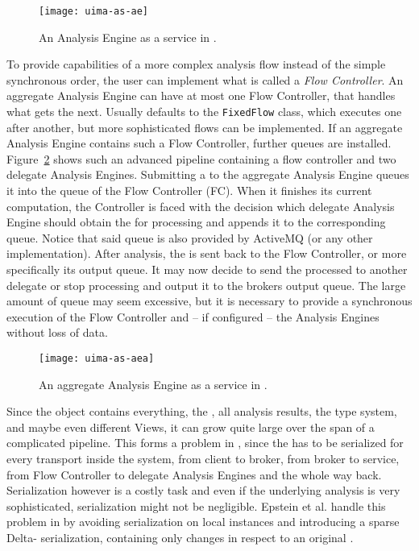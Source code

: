 \begin{figure}[hbt]
	\centering
	\texttt{[image: uima-as-ae]}
	\caption[An Analysis Engine as a service in UIMA-AS.]{An Analysis Engine as a service in \uimaas{} \cite{uimaas:documentation}.}
	\label{fig:uimaas-ae}
\end{figure}

To provide capabilities of a more complex analysis flow instead of the simple synchronous order, the user can implement what is called a \emph{Flow Controller}. An aggregate Analysis Engine can have at most one Flow Controller, that handles what \anen{} gets the \cas{} next. Usually \uima{} defaults to the \lstinline|FixedFlow| class, which executes \anens{} one after another, but more sophisticated flows can be implemented. If an aggregate Analysis Engine contains such a Flow Controller, further queues are installed. Figure~\ref{fig:uimaas-aea} shows such an advanced pipeline containing a flow controller and two delegate Analysis Engines. Submitting a \cas{} to the aggregate Analysis Engine queues it into the queue of the Flow Controller (FC). When it finishes its current computation, the Controller is faced with the decision which delegate Analysis Engine should obtain the \cas{} for processing and appends it to the corresponding queue. Notice that said queue is also provided by ActiveMQ (or any other implementation). After analysis, the \cas{} is sent back to the Flow Controller, or more specifically its output queue. It may now decide to send the processed \cas{} to another delegate \anen{} or stop processing and output it to the brokers output queue. The large amount of queue may seem excessive, but it is necessary to provide a synchronous execution of the Flow Controller and -- if configured -- the Analysis Engines without loss of data.

\begin{figure}[hbt]
	\centering
	\texttt{[image: uima-as-aea]}
	\caption[An aggregate Analysis Engine as a service in UIMA-AS.]{An aggregate Analysis Engine as a service in \uimaas{} \cite{uimaas:documentation}.}
	\label{fig:uimaas-aea}
\end{figure}

Since the \cas{} object contains everything, the \sofa{}, all analysis results, the type system, and maybe even different Views, it can grow quite large over the span of a complicated pipeline. This forms a problem in \uimaas{}, since the \cas{} has to be serialized for every transport inside the system, from client to broker, from broker to service, from Flow Controller to delegate Analysis Engines and the whole way back. Serialization however is a costly task and even if the underlying \nlp{} analysis is very sophisticated, serialization might not be negligible. Epstein et al. handle this problem in \cite{epstein2012making} by avoiding serialization on local instances and introducing a sparse Delta-\cas{} serialization, containing only changes in respect to an original \cas{}.

